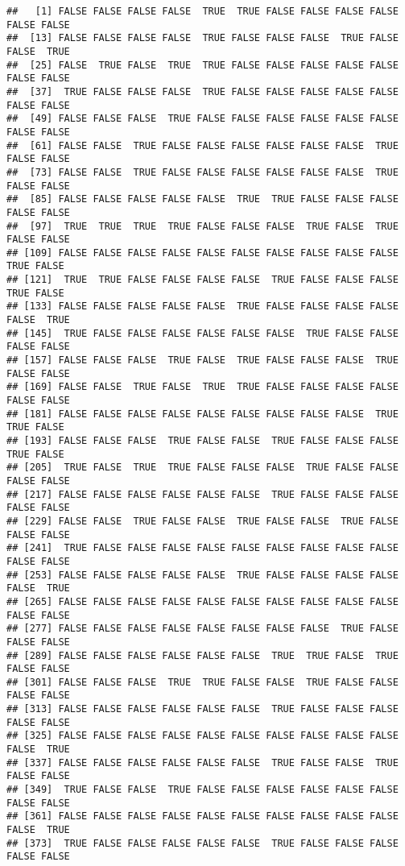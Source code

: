 \documentclass[
]{book}
\begin{document}
\begin{verbatim}
##   [1] FALSE FALSE FALSE FALSE  TRUE  TRUE FALSE FALSE FALSE FALSE FALSE FALSE
##  [13] FALSE FALSE FALSE FALSE  TRUE FALSE FALSE FALSE  TRUE FALSE FALSE  TRUE
##  [25] FALSE  TRUE FALSE  TRUE  TRUE FALSE FALSE FALSE FALSE FALSE FALSE FALSE
##  [37]  TRUE FALSE FALSE FALSE  TRUE FALSE FALSE FALSE FALSE FALSE FALSE FALSE
##  [49] FALSE FALSE FALSE  TRUE FALSE FALSE FALSE FALSE FALSE FALSE FALSE FALSE
##  [61] FALSE FALSE  TRUE FALSE FALSE FALSE FALSE FALSE FALSE  TRUE FALSE FALSE
##  [73] FALSE FALSE  TRUE FALSE FALSE FALSE FALSE FALSE FALSE  TRUE FALSE FALSE
##  [85] FALSE FALSE FALSE FALSE FALSE  TRUE  TRUE FALSE FALSE FALSE FALSE FALSE
##  [97]  TRUE  TRUE  TRUE  TRUE FALSE FALSE FALSE  TRUE FALSE  TRUE FALSE FALSE
## [109] FALSE FALSE FALSE FALSE FALSE FALSE FALSE FALSE FALSE FALSE  TRUE FALSE
## [121]  TRUE  TRUE FALSE FALSE FALSE FALSE  TRUE FALSE FALSE FALSE  TRUE FALSE
## [133] FALSE FALSE FALSE FALSE FALSE  TRUE FALSE FALSE FALSE FALSE FALSE  TRUE
## [145]  TRUE FALSE FALSE FALSE FALSE FALSE FALSE  TRUE FALSE FALSE FALSE FALSE
## [157] FALSE FALSE FALSE  TRUE FALSE  TRUE FALSE FALSE FALSE  TRUE FALSE FALSE
## [169] FALSE FALSE  TRUE FALSE  TRUE  TRUE FALSE FALSE FALSE FALSE FALSE FALSE
## [181] FALSE FALSE FALSE FALSE FALSE FALSE FALSE FALSE FALSE  TRUE  TRUE FALSE
## [193] FALSE FALSE FALSE  TRUE FALSE FALSE  TRUE FALSE FALSE FALSE  TRUE FALSE
## [205]  TRUE FALSE  TRUE  TRUE FALSE FALSE FALSE  TRUE FALSE FALSE FALSE FALSE
## [217] FALSE FALSE FALSE FALSE FALSE FALSE  TRUE FALSE FALSE FALSE FALSE FALSE
## [229] FALSE FALSE  TRUE FALSE FALSE  TRUE FALSE FALSE  TRUE FALSE FALSE FALSE
## [241]  TRUE FALSE FALSE FALSE FALSE FALSE FALSE FALSE FALSE FALSE FALSE FALSE
## [253] FALSE FALSE FALSE FALSE FALSE  TRUE FALSE FALSE FALSE FALSE FALSE  TRUE
## [265] FALSE FALSE FALSE FALSE FALSE FALSE FALSE FALSE FALSE FALSE FALSE FALSE
## [277] FALSE FALSE FALSE FALSE FALSE FALSE FALSE FALSE  TRUE FALSE FALSE FALSE
## [289] FALSE FALSE FALSE FALSE FALSE FALSE  TRUE  TRUE FALSE  TRUE FALSE FALSE
## [301] FALSE FALSE FALSE  TRUE  TRUE FALSE FALSE  TRUE FALSE FALSE FALSE FALSE
## [313] FALSE FALSE FALSE FALSE FALSE FALSE  TRUE FALSE FALSE FALSE FALSE FALSE
## [325] FALSE FALSE FALSE FALSE FALSE FALSE FALSE FALSE FALSE FALSE FALSE  TRUE
## [337] FALSE FALSE FALSE FALSE FALSE FALSE  TRUE FALSE FALSE  TRUE FALSE FALSE
## [349]  TRUE FALSE FALSE  TRUE FALSE FALSE FALSE FALSE FALSE FALSE FALSE FALSE
## [361] FALSE FALSE FALSE FALSE FALSE FALSE FALSE FALSE FALSE FALSE FALSE  TRUE
## [373]  TRUE FALSE FALSE FALSE FALSE FALSE  TRUE FALSE FALSE FALSE FALSE FALSE

\end{verbatim}
\end{document}
